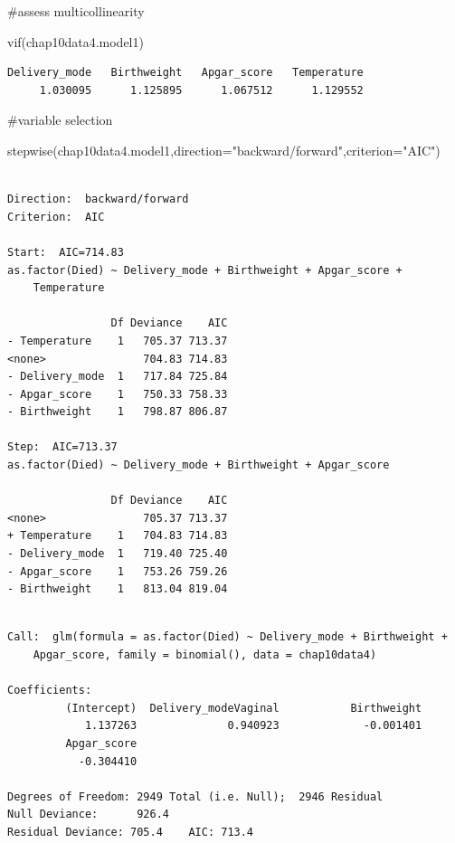 \documentclass[
  letterpaper,
  DIV=11,
  numbers=noendperiod]{scrartcl}
\newenvironment{Shaded}{\begin{snugshade}}{\end{snugshade}}
\newcommand{\AttributeTok}[1]{\textcolor[rgb]{0.40,0.45,0.13}{#1}}
\newcommand{\FunctionTok}[1]{\textcolor[rgb]{0.28,0.35,0.67}{#1}}
\newcommand{\NormalTok}[1]{\textcolor[rgb]{0.00,0.23,0.31}{#1}}
\newcommand{\StringTok}[1]{\textcolor[rgb]{0.13,0.47,0.30}{#1}}
\begin{document}
\#assess multicollinearity

\begin{Shaded}
\begin{Highlighting}[]
\FunctionTok{vif}\NormalTok{(chap10data4.model1)}
\end{Highlighting}
\end{Shaded}

\begin{verbatim}
Delivery_mode   Birthweight   Apgar_score   Temperature 
     1.030095      1.125895      1.067512      1.129552 
\end{verbatim}

\#variable selection

\begin{Shaded}
\begin{Highlighting}[]
\FunctionTok{stepwise}\NormalTok{(chap10data4.model1,}\AttributeTok{direction=}\StringTok{"backward/forward"}\NormalTok{,}\AttributeTok{criterion=}\StringTok{"AIC"}\NormalTok{)}
\end{Highlighting}
\end{Shaded}

\begin{verbatim}

Direction:  backward/forward
Criterion:  AIC 

Start:  AIC=714.83
as.factor(Died) ~ Delivery_mode + Birthweight + Apgar_score + 
    Temperature

                Df Deviance    AIC
- Temperature    1   705.37 713.37
<none>               704.83 714.83
- Delivery_mode  1   717.84 725.84
- Apgar_score    1   750.33 758.33
- Birthweight    1   798.87 806.87

Step:  AIC=713.37
as.factor(Died) ~ Delivery_mode + Birthweight + Apgar_score

                Df Deviance    AIC
<none>               705.37 713.37
+ Temperature    1   704.83 714.83
- Delivery_mode  1   719.40 725.40
- Apgar_score    1   753.26 759.26
- Birthweight    1   813.04 819.04
\end{verbatim}

\begin{verbatim}

Call:  glm(formula = as.factor(Died) ~ Delivery_mode + Birthweight + 
    Apgar_score, family = binomial(), data = chap10data4)

Coefficients:
         (Intercept)  Delivery_modeVaginal           Birthweight  
            1.137263              0.940923             -0.001401  
         Apgar_score  
           -0.304410  

Degrees of Freedom: 2949 Total (i.e. Null);  2946 Residual
Null Deviance:      926.4 
Residual Deviance: 705.4    AIC: 713.4
\end{verbatim}
\end{document}
